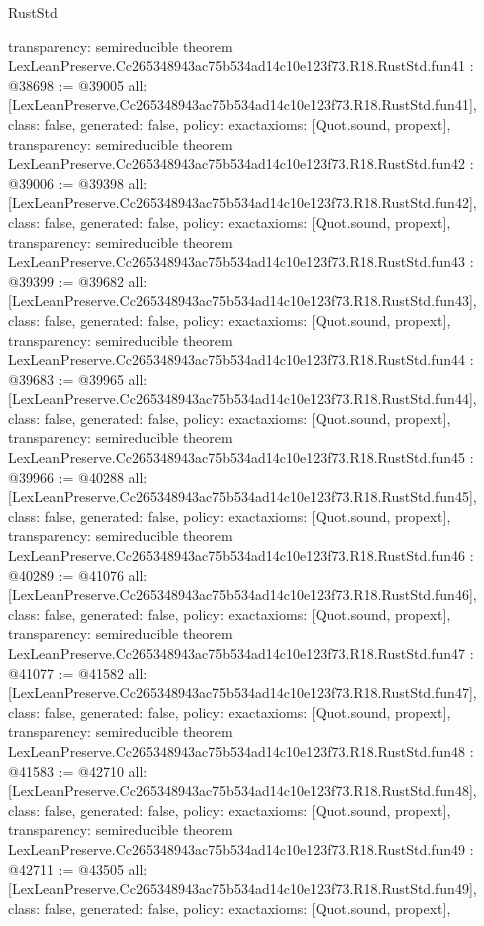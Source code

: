 \begin{lexlean}{RustStd}
\begin{coremodule}
{  transparency: semireducible
}
theorem LexLeanPreserve.Cc265348943ac75b534ad14c10e123f73.R18.RustStd.fun41 : @38698 := @39005 {
  all: [LexLeanPreserve.Cc265348943ac75b534ad14c10e123f73.R18.RustStd.fun41],
  class: false,
  generated: false,
  policy: exact{axioms: [Quot.sound, propext]},
  transparency: semireducible
}
theorem LexLeanPreserve.Cc265348943ac75b534ad14c10e123f73.R18.RustStd.fun42 : @39006 := @39398 {
  all: [LexLeanPreserve.Cc265348943ac75b534ad14c10e123f73.R18.RustStd.fun42],
  class: false,
  generated: false,
  policy: exact{axioms: [Quot.sound, propext]},
  transparency: semireducible
}
theorem LexLeanPreserve.Cc265348943ac75b534ad14c10e123f73.R18.RustStd.fun43 : @39399 := @39682 {
  all: [LexLeanPreserve.Cc265348943ac75b534ad14c10e123f73.R18.RustStd.fun43],
  class: false,
  generated: false,
  policy: exact{axioms: [Quot.sound, propext]},
  transparency: semireducible
}
theorem LexLeanPreserve.Cc265348943ac75b534ad14c10e123f73.R18.RustStd.fun44 : @39683 := @39965 {
  all: [LexLeanPreserve.Cc265348943ac75b534ad14c10e123f73.R18.RustStd.fun44],
  class: false,
  generated: false,
  policy: exact{axioms: [Quot.sound, propext]},
  transparency: semireducible
}
theorem LexLeanPreserve.Cc265348943ac75b534ad14c10e123f73.R18.RustStd.fun45 : @39966 := @40288 {
  all: [LexLeanPreserve.Cc265348943ac75b534ad14c10e123f73.R18.RustStd.fun45],
  class: false,
  generated: false,
  policy: exact{axioms: [Quot.sound, propext]},
  transparency: semireducible
}
theorem LexLeanPreserve.Cc265348943ac75b534ad14c10e123f73.R18.RustStd.fun46 : @40289 := @41076 {
  all: [LexLeanPreserve.Cc265348943ac75b534ad14c10e123f73.R18.RustStd.fun46],
  class: false,
  generated: false,
  policy: exact{axioms: [Quot.sound, propext]},
  transparency: semireducible
}
theorem LexLeanPreserve.Cc265348943ac75b534ad14c10e123f73.R18.RustStd.fun47 : @41077 := @41582 {
  all: [LexLeanPreserve.Cc265348943ac75b534ad14c10e123f73.R18.RustStd.fun47],
  class: false,
  generated: false,
  policy: exact{axioms: [Quot.sound, propext]},
  transparency: semireducible
}
theorem LexLeanPreserve.Cc265348943ac75b534ad14c10e123f73.R18.RustStd.fun48 : @41583 := @42710 {
  all: [LexLeanPreserve.Cc265348943ac75b534ad14c10e123f73.R18.RustStd.fun48],
  class: false,
  generated: false,
  policy: exact{axioms: [Quot.sound, propext]},
  transparency: semireducible
}
theorem LexLeanPreserve.Cc265348943ac75b534ad14c10e123f73.R18.RustStd.fun49 : @42711 := @43505 {
  all: [LexLeanPreserve.Cc265348943ac75b534ad14c10e123f73.R18.RustStd.fun49],
  class: false,
  generated: false,
  policy: exact{axioms: [Quot.sound, propext]},
}
\end{coremodule}
\end{lexlean}
